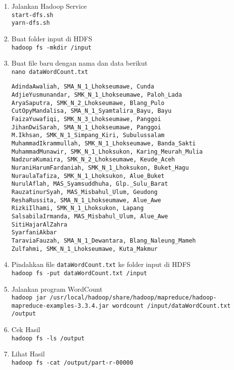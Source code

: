 \documentclass[a4paper]{tufte-handout}
\begin{document}
\begin{enumerate}
\item Jalankan Hadoop Service \\
{\tt start-dfs.sh} \\
{\tt yarn-dfs.sh}

\item Buat folder input di HDFS\\
{\tt hadoop fs -mkdir /input}

\item Buat file baru dengan nama dan data berikut \\
{\tt nano dataWordCount.txt}
\begin{lstlisting}
AdindaAwaliah, SMA_N_1_Lhokseumawe, Cunda
AdjieYusmunandar, SMK_N_1_Lhokseumawe, Paloh_Lada
AryaSaputra, SMK_N_2_Lhokseumawe, Blang_Pulo
CutOpyMandalisa, SMA_N_1_Syamtalira_Bayu, Bayu
FaizaYuwafiqi, SMK_N_3_Lhokseumawe, Panggoi
JihanDwiSarah, SMA_N_1_Lhokseumawe, Panggoi
M.Ikhsan, SMK_N_1_Simpang_Kiri, Subulussalam
MuhammadIkrammullah, SMK_N_1_Lhokseumawe, Banda_Sakti
MuhammadMunawir, SMK_N_1_Lhoksukon, Karing_Meurah_Mulia
NadzuraKumaira, SMK_N_2_Lhokseumawe, Keude_Aceh
NuraniHarumFardaniah, SMK_N_1_Lhoksukon, Buket_Hagu
NuraulaTafiza, SMK_N_1_Lhoksukon, Alue_Buket
NurulAflah, MAS_Syamsuddhuha, Glp._Sulu_Barat
RauzatinurSyah, MAS_Misbahul_Ulum, Geudong
ReshaRussita, SMA_N_1_Lhokseumawe, Alue_Awe
RizkiIlhami, SMK_N_1_Lhoksukon, Lapang
SalsabilaIrmanda, MAS_Misbahul_Ulum, Alue_Awe
SitiHajarAlZahra
SyarfaniAkbar
TaraviaFauzah, SMA_N_1_Dewantara, Blang_Naleung_Mameh
Zulfahmi, SMK_N_1_Lhokseumawe, Kuta_Makmur
\end{lstlisting}

\item Pindahkan file {\tt dataWordCount.txt} ke folder input di HDFS \\
{\tt hadoop fs -put dataWordCount.txt /input}

\item Jalankan program WordCount \\
{\tt hadoop jar /usr/local/hadoop/share/hadoop/mapreduce/hadoop-mapreduce-examples-3.3.4.jar wordcount /input/dataWordCount.txt /output}

\item Cek Hasil \\
{\tt hadoop fs -ls /output}

\item Lihat Hasil \\
{\tt hadoop fs -cat /output/part-r-00000}
\end{enumerate}
\end{document}
